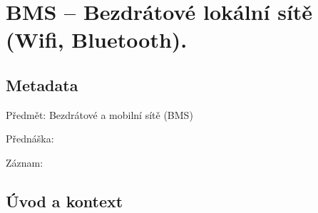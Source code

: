 

\chapter{BMS -- Bezdrátové lokální sítě (Wifi, Bluetooth).}


\section{Metadata}

\begin{compactitem}
    \item Předmět: Bezdrátové a mobilní sítě (BMS)
    \item Přednáška:
    \begin{compactitem}
        \item {}
    \end{compactitem}
    \item Záznam:
    \begin{compactitem}
        \item {}
    \end{compactitem}
\end{compactitem}


\section{Úvod a kontext}

